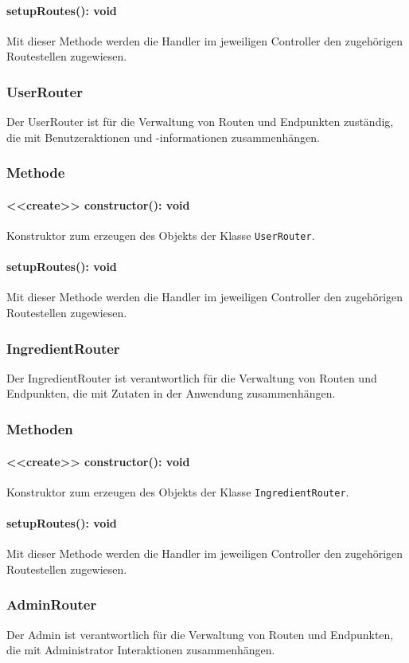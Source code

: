 \documentclass[parskip=full]{scrartcl}
\begin{document}
\paragraph{setupRoutes(): void}Mit dieser Methode werden die Handler im jeweiligen Controller den zugehörigen Routestellen zugewiesen.

\subsubsection{UserRouter}
Der UserRouter ist für die Verwaltung von Routen und Endpunkten zuständig, die mit Benutzeraktionen und -informationen zusammenhängen.
\subsubsection*{Methode}
\paragraph{<<create>> constructor(): void}Konstruktor zum erzeugen des Objekts der Klasse \texttt{UserRouter}.
\paragraph{setupRoutes(): void}Mit dieser Methode werden die Handler im jeweiligen Controller den zugehörigen Routestellen zugewiesen.

\subsubsection{IngredientRouter}
Der IngredientRouter ist verantwortlich für die Verwaltung von Routen und Endpunkten, die mit Zutaten in der Anwendung zusammenhängen.
\subsubsection*{Methoden}
\paragraph{<<create>> constructor(): void}Konstruktor zum erzeugen des Objekts der Klasse \texttt{IngredientRouter}.
\paragraph{setupRoutes(): void}Mit dieser Methode werden die Handler im jeweiligen Controller den zugehörigen Routestellen zugewiesen.

\subsubsection{AdminRouter}
Der Admin ist verantwortlich für die Verwaltung von Routen und Endpunkten, die mit Administrator Interaktionen zusammenhängen.
\end{document}

